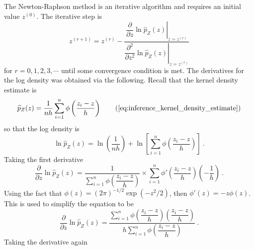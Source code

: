 The Newton-Raphson method is an iterative algorithm and requires an initial value $z^{(0)}$. The iterative step is
\begin{equation}
  z^{(r+1)} =
  z^{(r)}
  -\dfrac{
    \left.
      \dfrac{
        \partial
      }
      {
        \partial z
      }
      \ln\widehat{p}_Z(z)
    \right|_{z = z^{(r)}}
  }
  {
    \left.
      \dfrac{
        \partial^2
      }
      {
        \partial z^2
      }
      \ln\widehat{p}_Z(z)
    \right|_{z = z^{(r)}}
  } 
\end{equation}
for $r=0,1,2,3,\cdots$ until some convergence condition is met. The derivatives for the log density was obtained via the following. Recall that the kernel density estimate is
\begin{equation}
  \widehat{p}_Z(z)=
  \frac{1}{nh}
  \sum_{i=1}^n\phi\left(
    \dfrac{z_i-z}{h}
  \right)
  \tag{\ref{eq:inference_kernel_density_estimate}}
\end{equation}
so that the log density is
\begin{equation}
  \ln\widehat{p}_Z(z)=
  \ln\left(
    \dfrac{1}{nh}
  \right)
  +
  \ln\left[
    \sum_{i=1}^n
    \phi\left(
      \dfrac{
        z_i - z
      }
      {
        h
      }
    \right)
  \right]
  \ .
\end{equation}
Taking the first derivative
\begin{equation*}
  \dfrac{
    \partial
  }
  {
    \partial z
  }
  \ln\widehat{p}_Z(z)
  =
  \dfrac{
    1
  }
  {
    \sum_{i=1}^n
    \phi\left(
      \dfrac{
        z_i - z
      }
      {
        h
      }
    \right)
  }
  \times
  \sum_{i=1}^n
  \phi'\left(
    \dfrac{
      z_i - z
    }
    {
      h
    }
  \right)
  \left(
    -\dfrac{
      1
    }
    {
      h
    }
  \right)
  \ .
\end{equation*}
Using the fact that $\phi(z)=(2\pi)^{-1/2}\exp(-z^2/2)$, then $\phi'(z)=-z\phi(z)$. This is used to simplify the equation to be
\begin{equation}
  \dfrac{
    \partial
  }
  {
    \partial z
  }
  \ln\widehat{p}_Z(z)
  =
  \dfrac{
    \sum_{i=1}^n
    \phi\left(
      \dfrac{
        z_i - z
      }
      {
        h
      }
    \right)
    \left(
      \dfrac{
        z_i - z
      }
      {
        h
      }
    \right)
  }
  {
    h
    \sum_{i=1}^n
    \phi\left(
      \dfrac{
        z_i - z
      }
      {
        h
      }
    \right)
  }
  \ .
\end{equation}
Taking the derivative again
